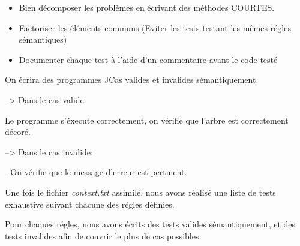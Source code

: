     \begin{itemize}
        \item Bien décomposer les problèmes en écrivant des méthodes COURTES.
        \item Factoriser les éléments communs (Eviter les tests testant les mêmes régles sémantiques)
        \item Documenter chaque test à l'aide d'un commentaire avant le code testé
    \end{itemize}

    \vspace{3mm}

    On écrira des programmes JCas valides et invalides sémantiquement.

    \vspace{3mm}

       --> Dans le cas valide:

    \tab   Le programme s'éxecute correctement, on vérifie que l'arbre
            est correctement décoré.

    \vspace{3mm}

        --> Dans le cas invalide:

    \tab     - On vérifie que le message d'erreur est pertinent.

    \vspace{10mm}

    Une fois le fichier \emph{context.txt} assimilé, nous avons réalisé une liste
    de tests exhaustive suivant chacune des régles définies.

    \vspace{3mm}

    Pour chaques régles, nous avons écrits des tests valides sémantiquement, et des
    tests invalides afin de couvrir le plus de cas possibles.

    \vspace{3mm}
